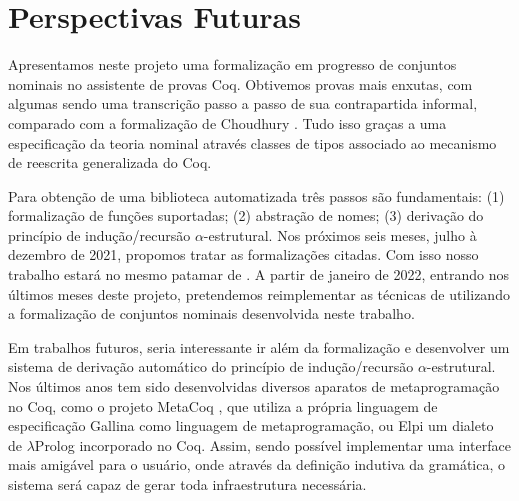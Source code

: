 \chapter{Perspectivas Futuras}\label{chp:perspectivas}
Apresentamos neste projeto uma formalização em progresso de conjuntos nominais no assistente de provas Coq. Obtivemos provas mais enxutas, com algumas sendo uma transcrição passo a passo de sua contrapartida informal, comparado com a formalização de Choudhury \cite{AgdaNominal}. Tudo isso graças a uma especificação da teoria nominal através classes de tipos associado ao mecanismo de reescrita generalizada do Coq.

Para obtenção de uma biblioteca automatizada três passos são fundamentais: (1) formalização de funções suportadas; (2) abstração de nomes; (3) derivação do princípio de indução/recursão $\alpha$-estrutural. Nos próximos seis meses, julho à dezembro de 2021, propomos tratar as formalizações citadas. Com isso nosso trabalho estará no mesmo patamar de \cite{Choudhury2015}. A partir de janeiro de 2022, entrando nos últimos meses deste projeto, pretendemos reimplementar as técnicas de \cite{Copello2016} utilizando a formalização de conjuntos nominais desenvolvida neste trabalho.

Em trabalhos futuros, seria interessante ir além da formalização e desenvolver um sistema de derivação automático do princípio de indução/recursão $\alpha$-estrutural. Nos últimos anos tem sido desenvolvidas diversos aparatos de metaprogramação no Coq, como o projeto MetaCoq \cite{Sozeau2020}, que utiliza a própria linguagem de especificação Gallina como linguagem de metaprogramação, ou Elpi \cite{Dunchev2015,Tassi2018} um dialeto de $\lambda$Prolog \cite{Miller2009} incorporado no Coq. Assim, sendo possível implementar uma interface mais amigável para o usuário, onde através da definição indutiva da gramática, o sistema será capaz de gerar toda infraestrutura necessária.